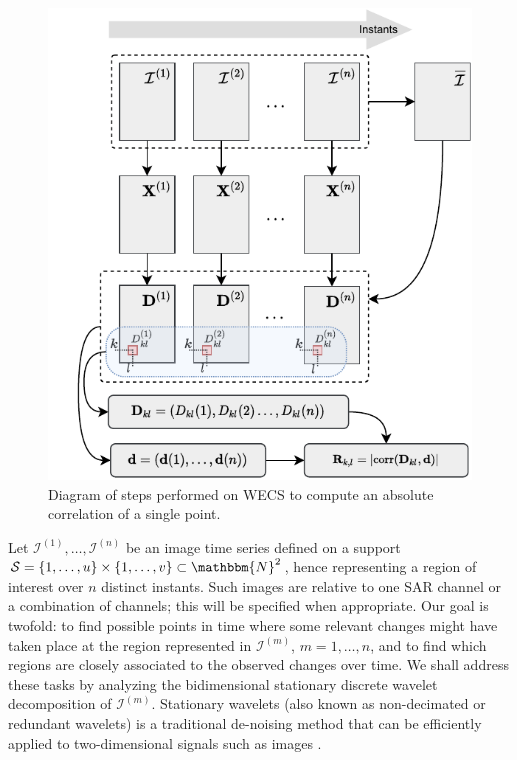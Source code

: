 \documentclass[journal]{IEEEtran}
\begin{document}
\begin{figure}[htb!]
\centering
\includegraphics[scale=.8]{../../drawio/diagram_wecs.drawio_11nov21}
\caption{Diagram of steps performed on WECS to compute an absolute correlation of a single point.}
\label{figDiagram}
\end{figure}




Let $\mathcal{I}^{(1)},\ldots,\mathcal{I}^{(n)}$ be an image time series defined on a support $\mathcal{S} = \left\lbrace 1,\ldots,u  \right\rbrace \times \left\lbrace 1,\ldots,v  \right\rbrace \subset \mathbbm{N}^2$, hence representing a region of interest over $n$ distinct instants.
%
Such images are relative to one SAR channel or a combination of channels; this will be specified when appropriate. 
Our goal is twofold: to find possible points in time where some relevant changes might have taken place at the region represented in $\mathcal{I}^{(m)}$, $m=1,\ldots,n$, and to find which regions are closely associated to the observed changes over time. We shall address these tasks by analyzing the bidimensional stationary discrete wavelet decomposition of $\mathcal{I}^{(m)}$. Stationary wavelets (also known as non-decimated or redundant wavelets) is a traditional de-noising method that can be efficiently applied to two-dimensional signals such as images \cite{coifman1995translation,atto2012multidate,atto2016wavelet}. 
\end{document}
